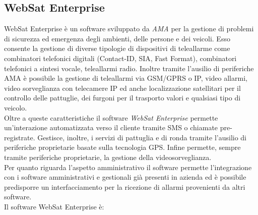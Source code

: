 \subsection{WebSat Enterprise}
WebSat Enterprise è un software sviluppato da \emph{AMA} per la gestione di problemi di sicurezza ed emergenza degli ambienti, delle persone e dei veicoli. Esso consente la gestione di diverse tipologie di dispositivi di teleallarme come combinatori telefonici digitali (Contact-ID, SIA, Fast Format), combinatori telefonici a sintesi vocale, teleallarmi radio. Inoltre tramite l'ausilio di periferiche AMA è possibile la gestione di teleallarmi via GSM/GPRS o IP, video allarmi, video sorveglianza con telecamere IP ed anche localizzazione satellitari per il controllo delle pattuglie, dei furgoni per il trasporto valori e qualsiasi tipo di veicolo.\\
Oltre a queste caratteristiche il software \emph{WebSat Enterprise} permette un'interazione automatizzata verso il cliente tramite SMS o chiamate pre-registrate. Gestisce, inoltre, i servizi di pattuglia e di ronda tramite l'ausilio di periferiche proprietarie basate sulla tecnologia GPS. Infine permette, sempre tramite periferiche proprietarie, la gestione della videosorveglianza.\\
Per quanto riguarda l'aspetto amministrativo il software permette l'integrazione con i software amministrativi e gestionali già presenti in azienda ed è  possibile predisporre un interfacciamento per la ricezione di allarmi provenienti da altri software.\\
Il software WebSat Enterprise è:

